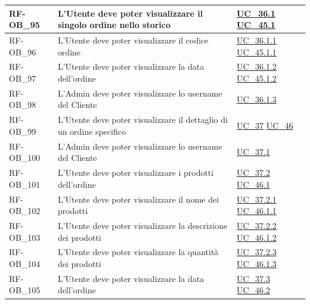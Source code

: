 \begin{longtable}{|>{\raggedright}p{}|>{\raggedright\arraybackslash}p{}|>{\raggedright\arraybackslash}p{}|}
	\hline
	RF-OB\_95 \hypertarget{rf-ob_95} & L'Utente deve poter visualizzare il singolo ordine nello storico & \hyperref[uc_36.1]{UC\_36.1} \newline \hyperref[uc_45.1]{UC\_45.1} \\
	\hline
	RF-OB\_96 \hypertarget{rf-ob_96} & L'Utente deve poter visualizzare il codice ordine & \hyperref[uc_36.1.1]{UC\_36.1.1} \newline \hyperref[uc_45.1.1]{UC\_45.1.1} \\
	\hline
	RF-OB\_97 \hypertarget{rf-ob_97} & L'Utente deve poter visualizzare la data dell'ordine & \hyperref[uc_36.1.2]{UC\_36.1.2} \newline \hyperref[uc_45.1.2]{UC\_45.1.2} \\
	\hline
	RF-OB\_98 \hypertarget{rf-ob_98} & L'Admin deve poter visualizzare lo username del Cliente & \hyperref[uc_36.1.3]{UC\_36.1.3} \\
	\hline
	RF-OB\_99 \hypertarget{rf-ob_99} & L'Utente deve poter visualizzare il dettaglio di un ordine specifico & \hyperref[uc_37]{UC\_37} \newline \hyperref[uc_46]{UC\_46} \\
	\hline
	RF-OB\_100 \hypertarget{rf-ob_100} & L'Admin deve poter visualizzare lo username del Cliente & \hyperref[uc_37.1]{UC\_37.1} \\
	\hline
	RF-OB\_101 \hypertarget{rf-ob_101} & L'Utente deve poter visualizzare i prodotti dell'ordine & \hyperref[uc_37.2]{UC\_37.2} \newline \hyperref[uc_46.1]{UC\_46.1} \\
	\hline
	RF-OB\_102 \hypertarget{rf-ob_102} & L'Utente deve poter visualizzare il nome dei prodotti & \hyperref[uc_37.2.1]{UC\_37.2.1} \newline \hyperref[uc_46.1.1]{UC\_46.1.1} \\
	\hline
	RF-OB\_103 \hypertarget{rf-ob_103} & L'Utente deve poter visualizzare la descrizione dei prodotti & \hyperref[uc_37.2.2]{UC\_37.2.2} \newline \hyperref[uc_46.1.2]{UC\_46.1.2} \\
	\hline
	RF-OB\_104 \hypertarget{rf-ob_104} & L'Utente deve poter visualizzare la quantità dei prodotti & \hyperref[uc_37.2.3]{UC\_37.2.3} \newline \hyperref[uc_46.1.3]{UC\_46.1.3} \\
	\hline
	RF-OB\_105 \hypertarget{rf-ob_105} & L'Utente deve poter visualizzare la data dell'ordine & \hyperref[uc_37.3]{UC\_37.3} \newline \hyperref[uc_46.2]{UC\_46.2} \\

\end{longtable}

